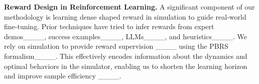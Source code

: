\noindent\textbf{Reward Design in Reinforcement Learning.} 
A significant component of our methodology is learning dense shaped reward in simulation to guide real-world fine-tuning. Prior techniques have tried to infer rewards from expert demos____, success examples____, LLMs____, and heuristics____. We rely on simulation to provide reward supervision ____ using the PBRS formalism____. This effectively encodes information about the dynamics and optimal behaviors in the simulator, enabling us to shorten the learning horizon and improve sample efficiency ____.